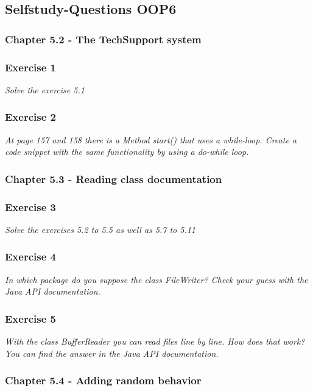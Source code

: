 \subsection{Selfstudy-Questions OOP6}

\subsubsection{Chapter 5.2 - The TechSupport system}

\subsubsection*{Exercise 1}
\textit{Solve the exercise 5.1}

\subsubsection*{Exercise 2}
\textit{At page 157 and 158 there is a Method start() that uses a 
while-loop. Create a code snippet with the same functionality by using a
do-while loop.}

\subsubsection{Chapter 5.3 - Reading class documentation}

\subsubsection*{Exercise 3}
\textit{Solve the exercises 5.2 to 5.5 as well as 5.7 to 5.11}

\subsubsection*{Exercise 4}
\textit{In which package do you suppose the class FileWriter?
Check your guess with the Java API documentation.}

\subsubsection*{Exercise 5}
\textit{With the class BufferReader you can read files line by line.
How does that work? You can find the answer in the Java API documentation.}

\subsubsection{Chapter 5.4 - Adding random behavior}

